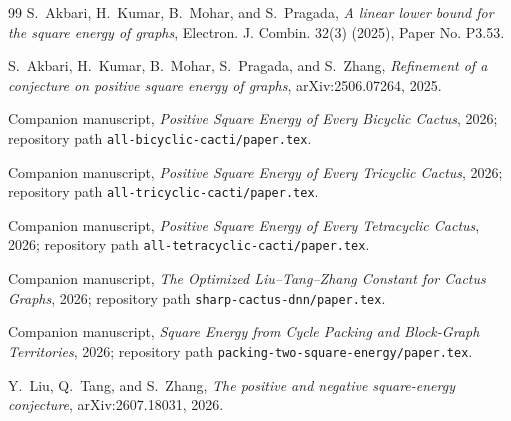 \documentclass[11pt]{article}
\begin{document}
\begin{thebibliography}{99}
S.~Akbari, H.~Kumar, B.~Mohar, and S.~Pragada,
\emph{A linear lower bound for the square energy of graphs},
Electron. J. Combin. 32(3) (2025), Paper No. P3.53.

S.~Akbari, H.~Kumar, B.~Mohar, S.~Pragada, and S.~Zhang,
\emph{Refinement of a conjecture on positive square energy of graphs},
arXiv:2506.07264, 2025.

Companion manuscript, \emph{Positive Square Energy of Every Bicyclic Cactus},
2026; repository path \texttt{all-bicyclic-cacti/paper.tex}.

Companion manuscript, \emph{Positive Square Energy of Every Tricyclic Cactus},
2026; repository path \texttt{all-tricyclic-cacti/paper.tex}.

Companion manuscript, \emph{Positive Square Energy of Every Tetracyclic
Cactus}, 2026; repository path \texttt{all-tetracyclic-cacti/paper.tex}.

Companion manuscript, \emph{The Optimized Liu--Tang--Zhang Constant for Cactus
Graphs}, 2026; repository path \texttt{sharp-cactus-dnn/paper.tex}.

Companion manuscript, \emph{Square Energy from Cycle Packing and Block-Graph
Territories}, 2026; repository path
\texttt{packing-two-square-energy/paper.tex}.

Y.~Liu, Q.~Tang, and S.~Zhang,
\emph{The positive and negative square-energy conjecture},
arXiv:2607.18031, 2026.
\end{thebibliography}
\end{document}
